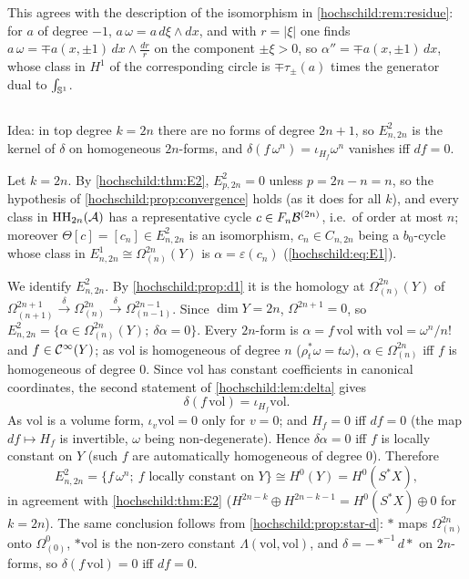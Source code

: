 This agrees with the description of the isomorphism in \cref{hochschild:rem:residue}: for $a$ of degree $-1$,
$a\,\omega=a\,d\xi\wedge dx$, and with $r=|\xi|$ one finds $a\,\omega=\mp a(x,\pm1)\,dx\wedge\frac{dr}r$ on the component
$\pm\xi>0$, so $\alpha''=\mp a(x,\pm1)\,dx$, whose class in $H^1$ of the corresponding circle is
$\mp\tau_\pm(a)$ times the generator dual to $\int_{\mathbb{S}^1}$.

\subsection*{}
Idea: in top degree $k=2n$ there are no forms of degree $2n+1$, so $E^2_{n,2n}$ is the kernel of
$\delta$ on homogeneous $2n$-forms, and $\delta(f\,\omega^n)=\iota_{H_f}\omega^n$ vanishes iff $df=0$.

Let $k=2n$. By \cref{hochschild:thm:E2}, $E^2_{p,2n}=0$ unless $p=2n-n=n$, so the hypothesis of
\cref{hochschild:prop:convergence} holds (as it does for all $k$), and every class in $\operatorname{HH}_{2n}(\mathcal{A})$ has a
representative cycle $c\in F_n\mathcal{B}^{(2n)}$, i.e.\ of order at most $n$; moreover $\Theta[c]=[c_n]\in E^2_{n,2n}$ is an
isomorphism, $c_n\in C_{n,2n}$ being a $b_0$-cycle whose class in $E^1_{n,2n}\cong\Omega^{2n}_{(n)}(Y)$ is
$\alpha=\varepsilon(c_n)$ (\eqref{hochschild:eq:E1}).

We identify $E^2_{n,2n}$. By \cref{hochschild:prop:d1} it is the homology at $\Omega^{2n}_{(n)}(Y)$ of
$\Omega^{2n+1}_{(n+1)}\xrightarrow{\delta}\Omega^{2n}_{(n)}\xrightarrow{\delta}\Omega^{2n-1}_{(n-1)}$. Since $\dim Y=2n$,
$\Omega^{2n+1}=0$, so $E^2_{n,2n}=\{\alpha\in\Omega^{2n}_{(n)}(Y);\ \delta\alpha=0\}$. Every $2n$-form is
$\alpha=f\,\mathrm{vol}$ with $\mathrm{vol}=\omega^n/n!$ and $f\in\mathcal{C}^\infty(Y)$; as $\mathrm{vol}$ is homogeneous of degree $n$
($\rho_t^*\omega=t\omega$), $\alpha\in\Omega^{2n}_{(n)}$ iff $f$ is homogeneous of degree $0$. Since $\mathrm{vol}$ has constant
coefficients in canonical coordinates, the second statement of \cref{hochschild:lem:delta} gives
\begin{equation*}
  \delta(f\,\mathrm{vol})=\iota_{H_f}\mathrm{vol}.
\end{equation*}
As $\mathrm{vol}$ is a volume form, $\iota_v\mathrm{vol}=0$ only for $v=0$; and $H_f=0$ iff $df=0$ (the map $df\mapsto H_f$
is invertible, $\omega$ being non-degenerate). Hence $\delta\alpha=0$ iff $f$ is locally constant on $Y$ (such $f$ are
automatically homogeneous of degree $0$). Therefore
\begin{equation*}
  E^2_{n,2n}=\{f\,\omega^n;\ f\text{ locally constant on }Y\}\cong H^0(Y)=H^0(S^*X),
\end{equation*}
in agreement with \cref{hochschild:thm:E2} ($H^{2n-k}\oplus H^{2n-k-1}=H^0(S^*X)\oplus0$ for $k=2n$). The same
conclusion follows from \cref{hochschild:prop:star-d}: $*$ maps $\Omega^{2n}_{(n)}$ onto $\Omega^0_{(0)}$, $*\mathrm{vol}$ is the
non-zero constant $\Lambda(\mathrm{vol},\mathrm{vol})$, and $\delta=-*^{-1}d*$ on $2n$-forms, so $\delta(f\,\mathrm{vol})=0$ iff
$df=0$.

